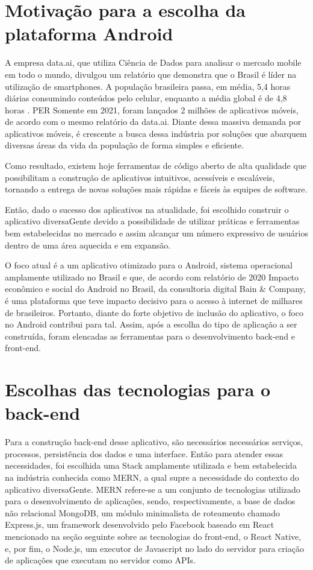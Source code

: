 \section{Motivação para a escolha da plataforma Android}
A empresa data.ai, que utiliza Ciência de Dados para analisar o mercado mobile em todo o mundo, divulgou um relatório que demonstra que o Brasil é líder na utilização de smartphones. A população brasileira passa, em média, 5,4 horas diárias consumindo conteúdos pelo celular, enquanto a média global é de 4,8 horas \cite{stateof}.
PER
Somente em 2021, foram lançados 2 milhões de aplicativos móveis, de acordo com o mesmo relatório da data.ai. Diante dessa massiva demanda por aplicativos móveis, é crescente a busca dessa indústria por soluções que abarquem diversas áreas da vida da população de forma simples e eficiente. 

Como resultado, existem hoje ferramentas de código aberto de alta qualidade que possibilitam a construção de aplicativos intuitivos, acessíveis e escaláveis, tornando a entrega de novas soluções mais rápidas e fáceis às equipes de software. 

Então, dado o sucesso dos aplicativos na atualidade, foi escolhido construir o aplicativo diversaGente devido a possibilidade de utilizar práticas e ferramentas bem estabelecidas no mercado e assim alcançar um número expressivo de usuários dentro de uma área aquecida e em expansão.

O foco atual é a um aplicativo otimizado para o Android, sistema operacional amplamente utilizado no Brasil e que, de acordo com relatório de 2020 Impacto econômico e social do Android no Brasil, da consultoria digital Bain & Company, é uma plataforma que teve impacto decisivo para o acesso à internet de milhares de brasileiros. Portanto, diante do forte objetivo de inclusão do aplicativo, o foco no Android contribui para tal.
Assim, após a escolha do tipo de aplicação a ser construída, foram elencadas as ferramentas para o desenvolvimento back-end e front-end. 


\section{Escolhas das tecnologias para o back-end}
Para a construção back-end desse aplicativo, são necessários necessários serviços, processos, persistência dos dados e uma interface. Então para atender essas necessidades, foi escolhida uma Stack amplamente utilizada e bem estabelecida na indústria conhecida como MERN, a qual supre a necessidade do contexto do aplicativo diversaGente. 
MERN refere-se a um conjunto de tecnologias utilizado para o desenvolvimento de aplicações, sendo, respectivamente, a base de dados não relacional MongoDB, um módulo minimalista de roteamento chamado Express.js, um framework desenvolvido pelo Facebook baseado em React mencionado na seção seguinte sobre as tecnologias do front-end,  o React Native, e, por fim, o Node.js, um executor de Javascript no lado do servidor para criação de aplicações que executam no servidor como APIs.

